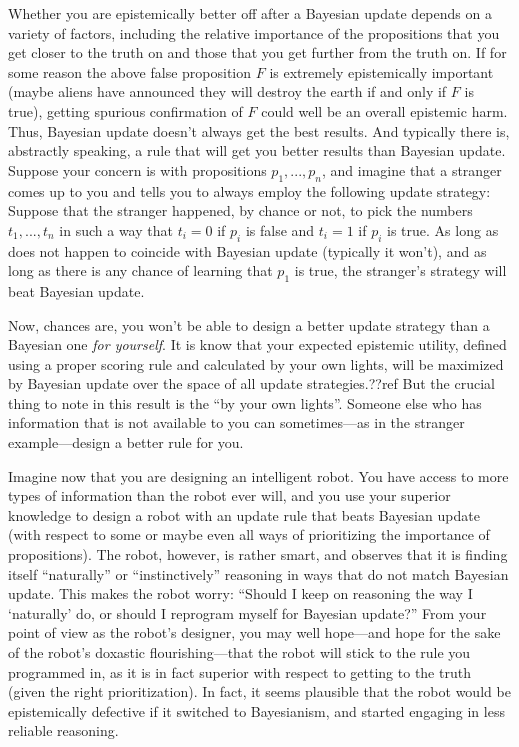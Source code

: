 Whether you are epistemically better off after a Bayesian update depends on a variety of factors, including the relative 
importance of the propositions that you get closer to the truth on and those that you get further from the truth on. 
If for some reason the above false proposition $F$ is extremely epistemically important (maybe aliens have announced they will 
destroy the earth if and only if $F$ is true), getting spurious confirmation of $F$ could well be an overall epistemic harm. 
Thus, Bayesian update doesn't always get the best results. And typically there is, abstractly speaking, 
a rule that will get you better results than Bayesian update. Suppose your concern is with propositions $p_1,...,p_n$, and 
imagine that a stranger comes up to you and tells you to always employ the following update strategy:
Suppose that the stranger happened, by chance or not, to pick the numbers $t_1,...,t_n$ in such a way that $t_i=0$ if 
$p_i$ is false and $t_i=1$ if $p_i$ is true. As long as  does not happen to coincide with Bayesian 
update (typically it won't), and as long as there is any chance of learning that $p_1$ is true, the stranger's strategy 
will beat Bayesian update. 

Now, chances are, you won't be able to design a better update strategy than a Bayesian one \textit{for yourself}.
It is know that your expected epistemic utility, defined using a proper scoring rule and calculated by your 
own lights, will be maximized by Bayesian update over the space of all update strategies.??ref But the crucial thing to 
note in this result is the ``by your own lights''. Someone else who has information that is not available to you can 
sometimes---as in the stranger example---design a better rule for you. 

Imagine now that you are designing an intelligent robot. You have access to more types of information than the robot ever 
will, and you use your superior knowledge to design a robot with an update rule that beats Bayesian update (with respect to 
some or maybe even all ways of prioritizing the importance of propositions). The robot, however, is rather smart, 
and observes that it is finding itself ``naturally'' or ``instinctively'' reasoning in ways that do not match Bayesian update. This makes the 
robot worry: ``Should I keep on reasoning the way I `naturally' do, or should I reprogram myself for Bayesian update?''
From your point of view as the robot's designer, you may well hope---and hope for the sake of the robot's doxastic
flourishing---that the robot will stick to the rule you programmed in, as it is in fact superior with respect to getting
to the truth (given the right prioritization). In fact, it seems plausible that the robot would be epistemically defective 
if it switched to Bayesianism, and started engaging in less reliable reasoning.


